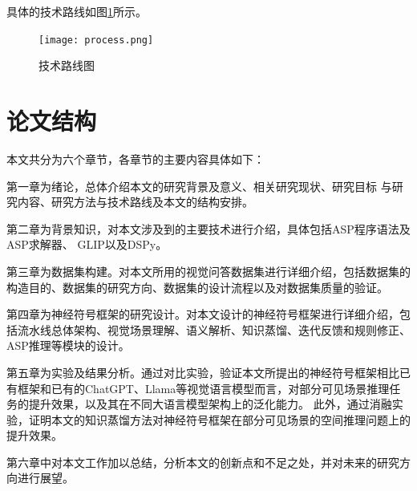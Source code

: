 具体的技术路线如图\ref{roadmap}所示。

\begin{figure}
    \centering
    \texttt{[image: process.png]}
    \caption{技术路线图\label{roadmap}}
\end{figure}

\section{论文结构}
本文共分为六个章节，各章节的主要内容具体如下：

第一章为绪论，总体介绍本文的研究背景及意义、相关研究现状、研究目标
与研究内容、研究方法与技术路线及本文的结构安排。

第二章为背景知识，对本文涉及到的主要技术进行介绍，具体包括ASP程序语法及ASP求解器、
GLIP以及DSPy。

第三章为数据集构建。对本文所用的视觉问答数据集进行详细介绍，包括数据集的构造目的、数据集的研究方向、数据集的设计流程以及对数据集质量的验证。

第四章为神经符号框架的研究设计。对本文设计的神经符号框架进行详细介绍，包括流水线总体架构、视觉场景理解、语义解析、知识蒸馏、迭代反馈和规则修正、ASP推理等模块的设计。

第五章为实验及结果分析。通过对比实验，验证本文所提出的神经符号框架相比已有框架和已有的ChatGPT、Llama等视觉语言模型而言，对部分可见场景推理任务的提升效果，以及其在不同大语言模型架构上的泛化能力。
此外，通过消融实验，证明本文的知识蒸馏方法对神经符号框架在部分可见场景的空间推理问题上的提升效果。

第六章中对本文工作加以总结，分析本文的创新点和不足之处，并对未来的研究方向进行展望。
